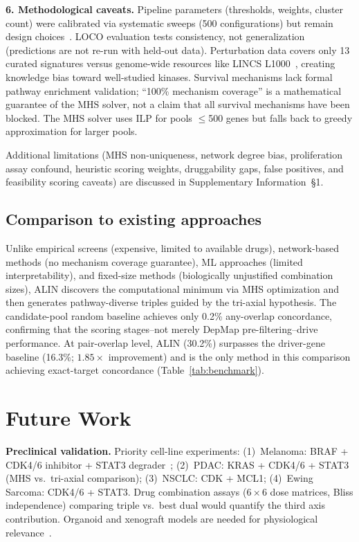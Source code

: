 \documentclass[times, twoside, watermark]{zHenriquesLab-StyleBioRxiv}
\begin{document}
\textbf{6. Methodological caveats.} Pipeline parameters (thresholds, weights, cluster count) were calibrated via systematic sweeps (500 configurations) but remain design choices~\cite{Dempster2021,Behan2019}. LOCO evaluation tests consistency, not generalization (predictions are not re-run with held-out data). Perturbation data covers only 13 curated signatures versus genome-wide resources like LINCS L1000~\cite{Subramanian2017}, creating knowledge bias toward well-studied kinases. Survival mechanisms lack formal pathway enrichment validation; ``100\% mechanism coverage'' is a mathematical guarantee of the MHS solver, not a claim that all survival mechanisms have been blocked. The MHS solver uses ILP for pools $\leq$500 genes but falls back to greedy approximation for larger pools.

Additional limitations (MHS non-uniqueness, network degree bias, proliferation assay confound, heuristic scoring weights, druggability gaps, false positives, and feasibility scoring caveats) are discussed in Supplementary Information~\S1.

\subsection*{Comparison to existing approaches}
Unlike empirical screens (expensive, limited to available drugs), network-based methods (no mechanism coverage guarantee), ML approaches (limited interpretability), and fixed-size methods (biologically unjustified combination sizes), ALIN discovers the computational minimum via MHS optimization and then generates pathway-diverse triples guided by the tri-axial hypothesis. The candidate-pool random baseline achieves only 0.2\% any-overlap concordance, confirming that the scoring stages--not merely DepMap pre-filtering--drive performance. At pair-overlap level, ALIN (30.2\%) surpasses the driver-gene baseline (16.3\%; $1.85\times$ improvement) and is the only method in this comparison achieving exact-target concordance (Table~\ref{tab:benchmark}).

\section*{Future Work}

\textbf{Preclinical validation.} Priority cell-line experiments: (1)~Melanoma: BRAF + CDK4/6 inhibitor + STAT3 degrader~\cite{Bai2019}; (2)~PDAC: KRAS + CDK4/6 + STAT3 (MHS vs.\ tri-axial comparison); (3)~NSCLC: CDK + MCL1; (4)~Ewing Sarcoma: CDK4/6 + STAT3. Drug combination assays ($6 \times 6$ dose matrices, Bliss independence) comparing triple vs.\ best dual would quantify the third axis contribution. Organoid and xenograft models are needed for physiological relevance~\cite{BenDavid2018}.
\end{document}
